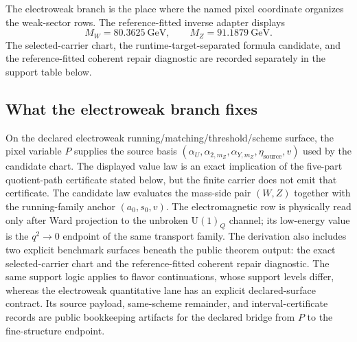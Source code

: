 \documentclass[11pt]{article}
\newcommand{\U}{\mathrm{U}}
\begin{document}
The electroweak branch is the place where the named pixel coordinate organizes the weak-sector rows. The
reference-fitted inverse adapter displays
\[
M_W=80.3625~\mathrm{GeV},
\qquad
M_Z=91.1879~\mathrm{GeV}.
\]
The selected-carrier chart, the runtime-target-separated formula candidate, and
the reference-fitted coherent repair diagnostic are recorded separately in the support
table below.

\subsection{What the electroweak branch fixes}

On the declared electroweak running/matching/threshold/scheme surface, the pixel variable \(P\) supplies the
source basis
\((\alpha_U,\alpha_{2,m_Z},\alpha_{Y,m_Z},\eta_{\mathrm{source}},v)\) used by the
candidate chart. The displayed value law is an exact implication of the
five-part quotient-path certificate stated below, but the finite carrier does
not emit that certificate. The candidate law evaluates the mass-side pair
\((W,Z)\) together with the running-family anchor \((a_0,s_0,v)\). The
electromagnetic row is physically read only after Ward projection to the unbroken \(\U(1)_Q\)
channel; its low-energy value is the \(q^2\to0\) endpoint of the same transport family. The
derivation also includes two explicit benchmark surfaces beneath the public theorem output: the
exact selected-carrier chart and the reference-fitted coherent repair diagnostic. The same support
logic applies to flavor continuations, whose support levels differ, whereas the
electroweak quantitative lane has an explicit declared-surface contract. Its source
payload, same-scheme remainder, and interval-certificate records are public bookkeeping artifacts
for the declared bridge from \(P\) to the fine-structure endpoint.
\end{document}

